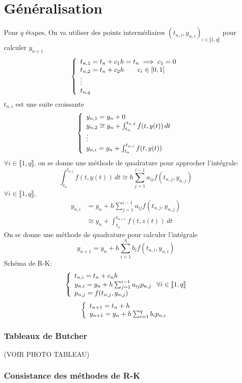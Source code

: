 \documentclass[]{report}
\begin{document}
    \section{Généralisation}

    Pour $q$ étapes, On va utiliser des points intermédiaires $(t_{n,i},y_{n,i})_{i\in \llbracket 1, q\rrbracket}$ pour calculer $y_{n+1}$\\
    \[\left\{\begin{array}{ll} t_{n,1}=t_n+c_1 h=t_n \implies c_1=0 \\
    t_{n,2}=t_n+c_2 h\qquad c_i\in [0,1]\\
    \vdots\\
    t_{n,q} \end{array} \right.\]
    $t_{n,i}$ est une suite croissante
    \[\left\{\begin{array}{ll} y_{n,1}=y_n+0\\
    y_{n,2}\cong y_n + \int_{t_n}^{t_{n,2}}f(t,y(t))\, dt\\
    \vdots\\
    y_{n,i}=y_n+\int_{t_n}^{t_{n,i}} f(t,y(t)) \end{array} \right.\]
    $\forall i\in \llbracket 1,q\rrbracket$, on se donne une méthode de quadrature pour approcher l'intégrale:
    \[\int_{t_n}^{t_{n,i}}f(t,y(t))\, dt \cong h\sum_{j=1}^{i-1}a_{ij}f(t_{n,j},y_{n,j})\]
    $\forall i\in \llbracket 1,q \rrbracket$,
    \begin{align*}
        y_{n,i}&=y_n+h\sum_{j=1}^{i-1}a_{ij} f(t_{n,j},y_{n,j})\\
        &\cong y_n +\int_{t_n}^{t_{n+1}}f(t,z(t))\, dt
    \end{align*}
    On se donne une méthode de quadrature pour calculer l'intégrale
    \[y_{n+1}=y_n+h\sum_{i=1}^{q}b_i f(t_{n,i},y_{n,i})\]
    Schéma de R-K:
    \[\left\{\begin{array}{ll} t_{n,i}=t_n+c_n h \\y_{n,i}=y_n+h\sum_{j=1}^{i-1}a_{ij}p_{n,j}\\p_{n,j}=f(t_{n,j},y_{n,j}) \end{array} \right.\forall i\in \llbracket 1,q \rrbracket\]
    \[\left\{\begin{array}{ll} t_{n+1}=t_n+h\\ y_{n+1}=y_n+h\sum_{i=1}^{q} b_i p_{n,i} \end{array} \right.\]

    \subsubsection*{Tableaux de Butcher}

    (VOIR PHOTO TABLEAU)

    \subsubsection*{Consistance des méthodes de R-K}
\end{document}
